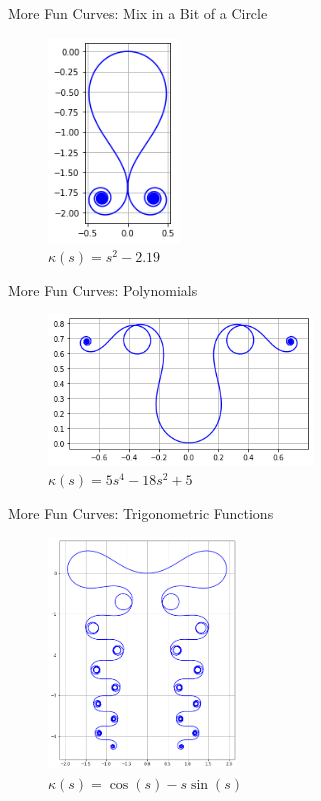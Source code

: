 \documentclass{beamer}
\begin{document}
\begin{frame}{More Fun Curves: Mix in a Bit of a Circle}
	\begin{figure}
		\caption{$\kappa(s) = s ^ 2 -2.19$}
		\centering
		\includegraphics[width=35mm, scale=0.2]{s_squared_minus_219.png}
	\end{figure}
\end{frame}

\begin{frame}{More Fun Curves: Polynomials}
	\begin{figure}
		\caption{$\kappa(s) = 5 s ^ 4 - 18 s ^ 2 + 5$}
		\centering
		\includegraphics[width=70mm, scale=0.5]{five_s^4.png}
	\end{figure}
\end{frame}

\begin{frame}{More Fun Curves: Trigonometric Functions}
	\begin{figure}
		\caption{$\kappa(s) = \cos(s) - s \sin(s)$}
		\centering
		\includegraphics[width=50mm, scale=0.2]{elegant_madness.png}
	\end{figure}
\end{frame}
	
\end{document}
